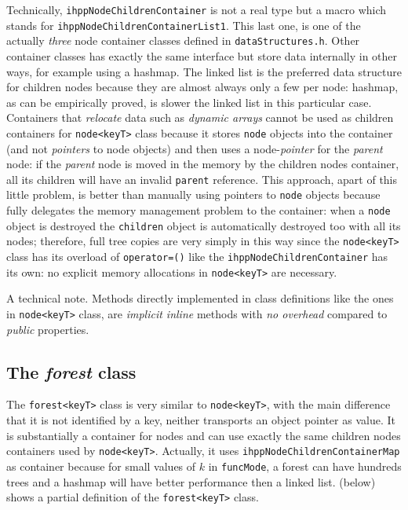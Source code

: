 \documentclass[a4paper,10pt]{report}
\begin{document}
\noindent
Technically, \verb|ihppNodeChildrenContainer| is not a real type but a macro which
stands for \verb|ihppNodeChildrenContainerList1|.
This last one, is one of the actually \emph{three} node container
classes defined in \verb|dataStructures.h|. Other container classes
has exactly the same interface but store data internally in other ways,
for example using a hashmap. The linked list is the preferred data structure
for children nodes because they are almost always only a few per node:
hashmap, as can be empirically proved, is slower the linked list
in this particular case. Containers that \emph{relocate} data
such as \emph{dynamic arrays} cannot be used as children containers for \verb|node<keyT>|
class because it stores \verb|node| objects into the container (and not \emph{pointers} to node objects) and then uses a node-\emph{pointer} for the \emph{parent} node:
if the \emph{parent} node is moved in the memory by the children nodes container,
all its children will have an invalid \verb|parent| reference.
This approach, apart of this little problem, is better than manually using pointers
to \verb|node| objects because fully delegates the memory management problem to the container: when a \verb|node| object is destroyed the \verb|children| object
is automatically destroyed too with all its nodes; therefore, full tree copies
are very simply in this way since the \verb|node<keyT>| class has its
overload of \verb|operator=()| like the \verb|ihppNodeChildrenContainer| has its own:
no explicit memory allocations in \verb|node<keyT>| are necessary.

A technical note. Methods directly implemented in class definitions like
the ones in \verb|node<keyT>| class, are \emph{implicit inline} methods with
\emph{no overhead} compared to \emph{public} properties.

\subsection{The \emph{forest} class}

The \verb|forest<keyT>| class is very similar to \verb|node<keyT>|, with
the main difference that it is not identified by a key, neither transports
an object pointer as value. It is substantially a container
for nodes and can use exactly the same children nodes containers used by \verb|node<keyT>|. Actually, it uses \verb|ihppNodeChildrenContainerMap| as container because for small values
of $k$ in \verb|funcMode|, a forest can have hundreds trees and a hashmap will have
better performance then a linked list.
 (below) shows a partial definition of the \verb|forest<keyT>| class.
\end{document}
